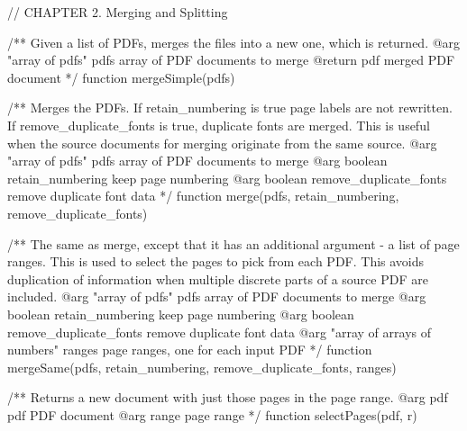 // CHAPTER 2. Merging and Splitting

/** Given a list of PDFs, merges the files into a new one, which is returned.
@arg {"array of pdfs"} pdfs array of PDF documents to merge
@return {pdf} merged PDF document */
function mergeSimple(pdfs) {}

/** Merges the PDFs. If retain_numbering is true page labels are not
rewritten. If remove_duplicate_fonts is true, duplicate fonts are merged.
This is useful when the source documents for merging originate from the same
source.
@arg {"array of pdfs"} pdfs array of PDF documents to merge
@arg {boolean} retain_numbering keep page numbering
@arg {boolean} remove_duplicate_fonts remove duplicate font data */
function merge(pdfs, retain_numbering, remove_duplicate_fonts) {}

/** The same as merge, except that it has an additional argument - a list of
page ranges. This is used to select the pages to pick from each PDF. This
avoids duplication of information when multiple discrete parts of a source PDF
are included.
@arg {"array of pdfs"} pdfs array of PDF documents to merge
@arg {boolean} retain_numbering keep page numbering
@arg {boolean} remove_duplicate_fonts remove duplicate font data 
@arg {"array of arrays of numbers"} ranges page ranges, one for each input PDF */
function mergeSame(pdfs, retain_numbering, remove_duplicate_fonts, ranges) {}

/** Returns a new document with just those pages in the page range.
@arg {pdf} pdf PDF document
@arg {range} page range */
function selectPages(pdf, r) {}

